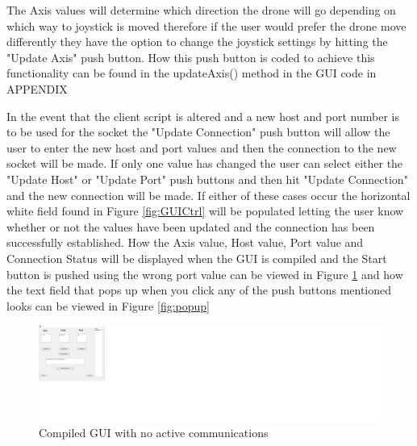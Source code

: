 The Axis values will determine which direction the drone will go depending on which way to joystick is moved therefore if the user would prefer the drone move differently they have the option to change the joystick settings by hitting the "Update Axis" push button. How this push button is coded to achieve this functionality can be found in the updateAxis() method in the GUI code in APPENDIX

In the event that the client script is altered and a new host and port number is to be used for the socket the "Update Connection" push button will allow the user to enter the new host and port values and then the connection to the new socket will be made. If only one value has changed the user can select either the "Update Host" or "Update Port" push buttons and then hit "Update Connection" and the new connection will be made. If either of these cases occur the horizontal white field found in Figure \ref{fig:GUICtrl} will be populated letting the user know whether or not the values have been updated and the connection has been successfully established. How the Axis value, Host value, Port value and Connection Status will be displayed when the GUI is compiled and the Start button is pushed using the wrong port value can be viewed in Figure \ref{fig:guipop1} and how the text field that pops up when you click any of the push buttons mentioned looks can be viewed in Figure \ref{fig:popup}

\begin{figure}[H]
	\includegraphics[width=\linewidth]{GUICtrlPop}
	\caption{Compiled GUI with no active communications}
	\label{fig:guipop1}
\end{figure}

